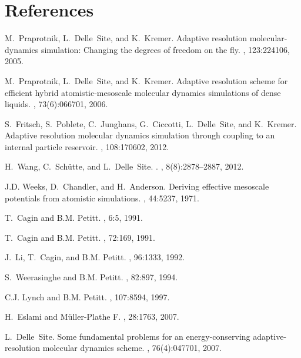 \documentclass[aps,a4paper,reprint,onecolumn]{revtex4}
\begin{document}
\section*{References}
\begin{thebibliography}{10}

M.~Praprotnik, L.~Delle~Site, and K.~Kremer.
\newblock Adaptive resolution molecular-dynamics simulation: Changing the
  degrees of freedom on the fly.
, 123:224106, 2005.

M.~Praprotnik, L.~Delle~Site, and K.~Kremer.
\newblock Adaptive resolution scheme for efficient hybrid atomistic-mesoscale
  molecular dynamics simulations of dense liquids.
, 73(6):066701, 2006.

S.~Fritsch, S.~Poblete, C.~Junghans, G.~Ciccotti, L.~Delle~Site, and K.~Kremer.
\newblock Adaptive resolution molecular dynamics simulation through coupling to
  an internal particle reservoir.
, 108:170602, 2012.

H.~Wang, C.~Sch\"utte, and L.~Delle~Site.
.
, 8(8):2878--2887,
  2012.

J.D. Weeks, D.~Chandler, and H.~Anderson.
\newblock Deriving effective mesoscale potentials from atomistic simulations.
, 44:5237, 1971.

T.~Cagin and B.M. Petitt.
, 6:5, 1991.

T.~Cagin and B.M. Petitt.
, 72:169, 1991.

J.~Li, T.~Cagin, and B.M. Petitt.
, 96:1333, 1992.

S.~Weerasinghe and B.M. Petitt.
, 82:897, 1994.

C.J. Lynch and B.M. Petitt.
, 107:8594, 1997.

H.~Eslami and M\"{u}ller-Plathe F.
, 28:1763, 2007.

L.~Delle~Site.
\newblock Some fundamental problems for an energy-conserving
  adaptive-resolution molecular dynamics scheme.
, 76(4):047701, 2007.


\end{thebibliography}
\end{document}

